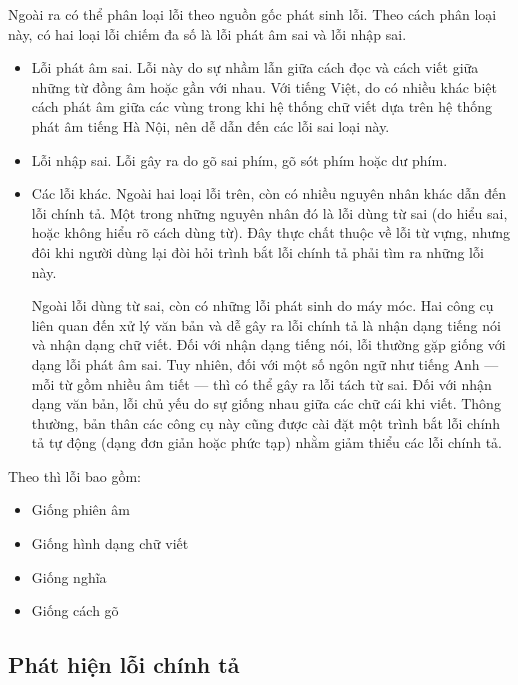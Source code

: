 \documentclass[a4paper,oneside,14pt]{extbook} %
\begin{document}
Ngoài ra có thể phân loại lỗi theo nguồn gốc phát sinh lỗi. Theo cách
phân loại này, có hai loại lỗi chiếm đa số là lỗi phát âm sai và lỗi
nhập sai.
\begin{itemize}
\item Lỗi phát âm sai.
  Lỗi này do sự nhầm lẫn giữa cách đọc và cách
  viết giữa những từ đồng âm hoặc gần với nhau. Với tiếng Việt, do có
  nhiều khác biệt cách phát âm giữa các vùng trong khi hệ thống chữ
  viết dựa trên hệ thống phát âm tiếng Hà Nội, nên dễ dẫn đến các lỗi
  sai loại này.

\item Lỗi nhập sai. 
  Lỗi gây ra do gõ sai phím, gõ sót phím hoặc dư phím.

\item Các lỗi khác.
  Ngoài hai loại lỗi trên, còn có nhiều nguyên nhân khác dẫn đến lỗi
  chính tả. Một trong những nguyên nhân đó là lỗi dùng từ sai (do hiểu
  sai, hoặc không hiểu rõ cách dùng từ). Đây thực chất thuộc về lỗi từ
  vựng, nhưng đôi khi người dùng lại đòi hỏi trình bắt lỗi chính tả phải
  tìm ra những lỗi này.
  
  Ngoài lỗi dùng từ sai, còn có những lỗi phát sinh do máy móc. Hai công
  cụ liên quan đến xử lý văn bản và dễ gây ra lỗi chính tả là nhận dạng
  tiếng nói và nhận dạng chữ viết. Đối với nhận dạng tiếng nói, lỗi
  thường gặp giống với dạng lỗi phát âm sai. Tuy nhiên, đối với một số
  ngôn ngữ như tiếng Anh --- mỗi từ gồm nhiều âm tiết --- thì có thể gây
  ra lỗi tách từ sai. Đối với nhận dạng văn bản, lỗi chủ yếu do sự giống
  nhau giữa các chữ cái khi viết. Thông thường, bản thân các công cụ này
  cũng được cài đặt một trình bắt lỗi chính tả tự động (dạng đơn giản
  hoặc phức tạp) nhằm giảm thiểu các lỗi chính tả.
\end{itemize}


\noindent Theo \cite{Chang} thì lỗi bao gồm:
\begin{itemize}
\item Giống phiên âm
\item Giống hình dạng chữ viết
\item Giống nghĩa
\item Giống cách gõ
\end{itemize}

\subsection{Phát hiện lỗi chính tả}
\end{document}

